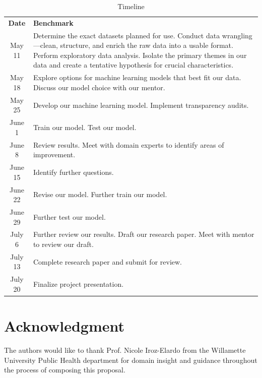 \documentclass[journal]{IEEEtran}
\begin{document}
	\begin{table}[!t]
		\renewcommand{\arraystretch}{1.3}
		\caption{Timeline}
		\label{timeline}
		\centering
		\begin{tabular}{c|p{6cm}}
			\textbf{Date} & \textbf{Benchmark} \\
			May 11 & Determine the exact datasets planned for use.
			\newline Conduct data wrangling—clean, structure, and enrich the raw data into a usable format.
			\newline Perform exploratory data analysis.
			\newline Isolate the primary themes in our data and create a tentative hypothesis for crucial characteristics.\\
			May 18 & Explore options for machine learning models that best fit our data.
			\newline Discuss our model choice with our mentor. \\
			May 25 & Develop our machine learning model.
			\newline Implement transparency audits. \\
			June 1 & Train our model.
			\newline Test our model. \\
			June 8 & Review results.
			\newline Meet with domain experts to identify areas of improvement. \\
			June 15 & Identify further questions. \\
			June 22 & Revise our model.
			\newline Further train our model. \\
			June 29 & Further test our model. \\
			July 6 & Further review our results.
			\newline Draft our research paper.
			\newline Meet with mentor to review our draft. \\
			July 13 & Complete research paper and submit for review. \\
			July 20 & Finalize project presentation. \\
		\end{tabular}
	\end{table}

	\section*{Acknowledgment}

	The authors would like to thank Prof. Nicole Iroz-Elardo from the Willamette University Public Health department for domain insight and guidance throughout the process of composing this proposal.

	
	
\end{document}
